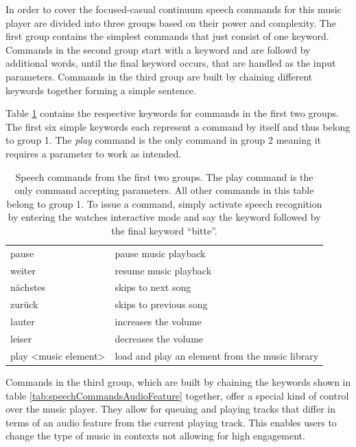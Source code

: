 In order to cover the focused-casual continuum speech commands for this music player are divided into three groups based on their power and complexity. The first group contains the simplest commands that just consist of one keyword. Commands in the second group start with a keyword and are followd by additional words, until the final keyword occurs, that are handled as the input parameters. Commands in the third group are built by chaining different keywords together forming a simple sentence.

Table \ref{tab:speechCommands} contains the respective keywords for commands in the first two groups. The first six simple keywords each represent a command by itself and thus belong to group 1. The \textit{play} command is the only command in group 2 meaning it requires a parameter to work as intended.

\begin{table}[bt]
	\myfloatalign
	\begin{tabularx}{\textwidth}{XX} \toprule
		\tableheadline{Speech Command Keywords} & \tableheadline{Actions in Music Player} \\ 
		\midrule
		pause & pause music playback \\
		weiter & resume music playback \\
		n\"achstes & skips to next song \\
		zur\"uck & skips to previous song \\
		lauter & increases the volume \\
		leiser & decreases the volume \\
		\midrule
		play <music element> & load and play an element from the music library \\
		\bottomrule
	\end{tabularx}
	\caption{Speech commands from the first two groups. The play command is the only command accepting parameters. All other commands in this table belong to group 1. To issue a command, simply activate speech recognition by entering the watches interactive mode and say the keyword followed by the final keyword ``bitte''.}
	\label{tab:speechCommands}
\end{table}

Commands in the third group, which are built by chaining the keywords shown in table \ref{tab:speechCommandsAudioFeature} together, offer a special kind of control over the music player. They allow for queuing and playing tracks that differ in terms of an audio feature from the current playing track. This enables users to change the type of music in contexts not allowing for high engagement.

